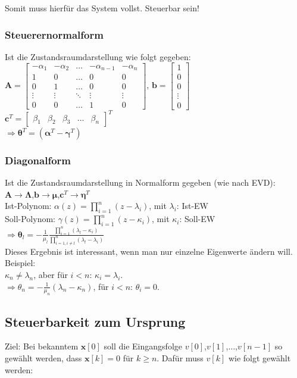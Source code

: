 \documentclass[a4paper,landscape,6pt]{article}
\newcommand{\ma}[1]{\ensuremath{\boldsymbol {#1}}}								%
\newcommand{\mat}[1]{\ensuremath{\begin{bmatrix} #1 \end{bmatrix}}}				%
\renewcommand{\vec}[1]{\ensuremath{\boldsymbol {#1}}}							%
\begin{document}
\begin{multicols}{3}
Somit muss hierfür das System vollst. Steuerbar sein!
\newpage
\subsubsection*{Steuerernormalform}
Ist die Zustandsraumdarstellung wie folgt gegeben:\\
$\ma A = \mat{-\alpha_1 & -\alpha_2 & \dots &-\alpha_{n-1} &-\alpha_n \\ 1 & 0 & \dots & 0 & 0 \\ 0 & 1 & \dots & 0 & 0 \\ \vdots & \vdots & \ddots & \vdots & \vdots \\ 0 & 0 & \dots & 1 & 0}$, 
$\vec b = \mat{1\\0\\0\\ \vdots \\ 0}$\\ 
$\vec c^T = \mat{\beta_1&\beta_2&\beta_3& \dots & \beta_n}^T$\\

$\Rightarrow\vec \theta ^T = (\vec \alpha ^T - \vec \gamma ^T)$\\
\subsubsection*{Diagonalform}
Ist die Zustandsraumdarstellung in Normalform gegeben (wie nach EVD):
$\ma A \rightarrow \ma \Lambda$,\tab $\vec b \rightarrow \vec \mu$,\tab $\vec c^T \rightarrow \vec \eta^T$\\
Ist-Polynom: $\alpha(z) = \prod_{i=1}^n (z-\lambda_i)$, mit $\lambda_i$: Ist-EW\\
Soll-Polynom: $\gamma(z) = \prod_{i=1}^n (z-\kappa_i)$, mit $\kappa_i$: Soll-EW\\

$\Rightarrow\vec \theta_l = -\frac{1}{\mu_l}\frac{\prod_{i=1}^n(\lambda_l - \kappa_i)}{\prod_{i=1, i\ne l}^n(\lambda_l - \lambda_i)}$\\

Dieses Ergebnis ist interessant, wenn man nur einzelne Eigenwerte ändern will. Beispiel:\\
$\kappa_n \ne \lambda_n$, aber für $i<n$: $\kappa_i = \lambda_i$.\\
$\Rightarrow \theta_n = -\frac{1}{\mu_n}(\lambda_n - \kappa_n)$, für $i<n$: $\theta_i = 0$.

\subsection*{Steuerbarkeit zum Ursprung}
Ziel: Bei bekanntem $\vec x[0]$ soll die Eingangsfolge $v[0]$,$v[1]$,$\dots$,$v[n-1]$ so gewählt werden, dass $\vec x[k] = 0$ für $k\ge n$. Dafür muss $v[k]$ wie folgt gewählt werden:\\


\end{multicols}
\end{document}
